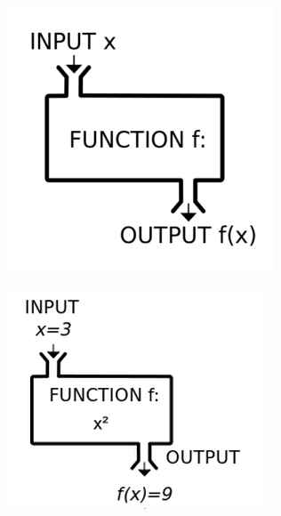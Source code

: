 \documentclass[
  12pt,
]{book}
\begin{document}
\begin{center}\includegraphics[width=1\linewidth]{images/function2} \end{center}

\begin{center}\includegraphics[width=1\linewidth]{images/function} \end{center}
\end{document}
